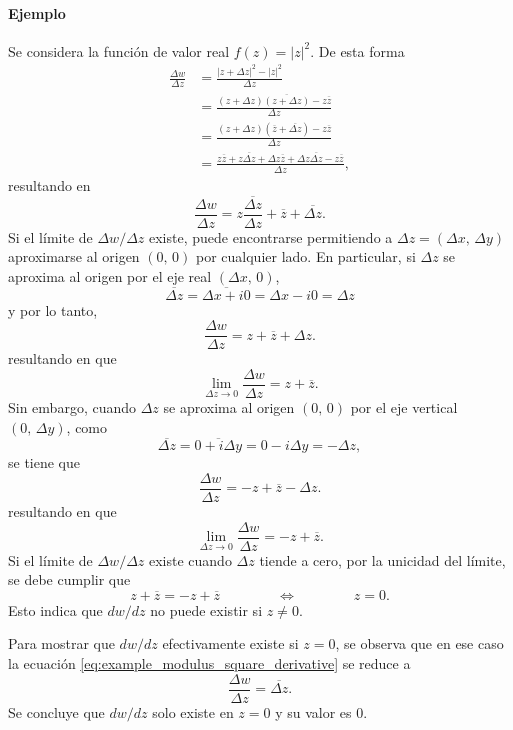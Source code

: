 \documentclass[a4paper]{report}
\begin{document}
\paragraph{Ejemplo} Se considera la función de valor real \(f(z)=|z|^2\). De esta forma
\begin{align*}
 \frac{\Delta w}{\Delta z}&=\frac{|z+\Delta z|^2-|z|^2}{\Delta z}\\
  &=\frac{(z+\Delta z)\overline{(z+\Delta z)}-z\overline{z}}{\Delta z}\\
  &=\frac{(z+\Delta z)(\overline{z}+\overline{\Delta z})-z\overline{z}}{\Delta z}\\
  &=\frac{z\overline{z}+z\overline{\Delta z}+\Delta z\overline{z}+\Delta z\overline{\Delta z}-z\overline{z}}{\Delta z}, 
\end{align*}
resultando en
\begin{equation}\label{eq:example_modulus_square_derivative}
 \frac{\Delta w}{\Delta z}=z\frac{\overline{\Delta z}}{\Delta z}+\overline{z}+\overline{\Delta z}.
\end{equation}
Si el límite de \(\Delta w/\Delta z\) existe, puede encontrarse permitiendo a \(\Delta z=(\Delta x,\,\Delta y)\) aproximarse al origen \((0,\,0)\) por cualquier lado. En particular, si \(\Delta z\) se aproxima al origen por el eje real \((\Delta x,\,0)\),
\[
 \overline{\Delta z}=\overline{\Delta x+i0}=\Delta x-i0=\Delta z
\]
y por lo tanto,
\[
 \frac{\Delta w}{\Delta z}=z+\overline{z}+\Delta z.
\]
resultando en que 
\[
 \lim_{\Delta z\to0}\frac{\Delta w}{\Delta z}=z+\overline{z}.
\]
Sin embargo, cuando \(\Delta z\) se aproxima al origen \((0,\,0)\) por el eje vertical \((0,\,\Delta y)\), como
\[
 \overline{\Delta z}=\overline{0+i\Delta y}=0-i\Delta y=-\Delta z,
\]
se tiene que 
\[
 \frac{\Delta w}{\Delta z}=-z+\overline{z}-\Delta z.
\]
resultando en que 
\[
 \lim_{\Delta z\to0}\frac{\Delta w}{\Delta z}=-z+\overline{z}.
\]
Si el límite de \(\Delta w/\Delta z\) existe cuando \(\Delta z\) tiende a cero, por la unicidad del límite, se debe cumplir que 
\[
 z+\overline{z}=-z+\overline{z}
 \qquad\qquad\Leftrightarrow\qquad\qquad
 z=0.
\]
Esto indica que \(dw/dz\) no puede existir si \(z\neq0\).

Para mostrar que \(dw/dz\) efectivamente existe si \(z=0\), se observa que en ese caso la ecuación \ref{eq:example_modulus_square_derivative} se reduce a 
\[
 \frac{\Delta w}{\Delta z}=\overline{\Delta z}.
\]
Se concluye que \(dw/dz\) solo existe en \(z=0\) y su valor es 0.
\end{document}
